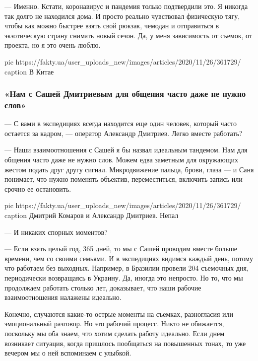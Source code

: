 --- Именно. Кстати, коронавирус и пандемия только подтвердили это. Я никогда
так долго не находился дома. И просто реально чувствовал физическую тягу,
чтобы как можно быстрее взять свой рюкзак, чемодан и отправиться
в экзотическую страну снимать новый сезон. Да, у меня зависимость
от съемок, от проекта, но я это очень люблю.

\ifcmt
pic https://fakty.ua/user_uploads_new/images/articles/2020/11/26/361729/%
caption  В Китае
\fi

\subsubsection{«Нам с Сашей Дмитриевым для общения часто даже не нужно слов»}

--- С вами в экспедициях всегда находится еще один человек, который часто
остается за кадром, --- оператор Александр Дмитриев. Легко вместе работать?

--- Наши взаимоотношения с Сашей я бы назвал идеальным тандемом. Нам для
общения часто даже не нужно слов. Можем едва заметным для окружающих
жестом подать друг другу сигнал. Микродвижение пальца, брови, глаза —
и Саня понимает, что нужно поменять объектив, переместиться, включить
запись или срочно ее остановить.

\ifcmt
pic https://fakty.ua/user_uploads_new/images/articles/2020/11/26/361729/%
caption  Дмитрий Комаров и Александр Дмитриев. Непал
\fi

--- И никаких спорных моментов?

--- Если взять целый год, 365 дней, то мы с Сашей проводим вместе больше
времени, чем со своими семьями. И в экспедициях видимся каждый день,
потому что работаем без выходных. Например, в Бразилии провели 204
съемочных дня, периодически возвращаясь в Украину. Да, иногда это
непросто. Но то, что мы продолжаем работать столько лет, доказывает, что
наши рабочие взаимоотношения налажены идеально.

Конечно, случаются какие-то острые моменты на съемках, разногласия или
эмоциональный разговор. Но это рабочий процесс. Никто не обижается,
поскольку мы оба знаем, что хотим сделать работу идеально. Если днем
возникает ситуация, когда пришлось пообщаться на повышенных тонах, то уже
вечером мы о ней вспоминаем с улыбкой.

